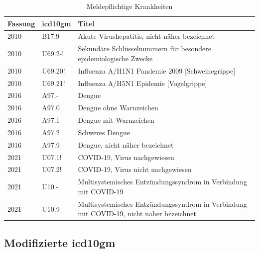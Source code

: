 \begin{table}[ht]
	\centering
	\small
	\caption[Meldepflichtige \acs{icd10gm}]{Meldepflichtige Krankheiten}
	\label{tab:meldung}
	\begin{tabular}{|l|l|p{10.5cm}|}
		\hline
		\rowcolor{lightgray} Fassung & \acs{icd10gm} & Titel \\ \hline
		2010 & B17.9 & Akute Virushepatitis, nicht näher bezeichnet \\ \hline
		2010 & U69.2-! & Sekundäre Schlüsselnummern für besondere epidemiologische Zwecke \\ \hline
		2010 & U69.20! & Influenza A/H1N1 Pandemie 2009 [Schweinegrippe] \\ \hline
		2010 & U69.21! & Influenza A/H5N1 Epidemie [Vogelgrippe] \\ \hline
		2016 & A97.- & Dengue \\ \hline
		2016 & A97.0 & Dengue ohne Warnzeichen \\ \hline
		2016 & A97.1 & Dengue mit Warnzeichen \\ \hline
		2016 & A97.2 & Schweres Dengue \\ \hline
		2016 & A97.9 & Dengue, nicht näher bezeichnet \\ \hline
		2021 & U07.1! & COVID-19, Virus nachgewiesen \\ \hline
		2021 & U07.2! & COVID-19, Virus nicht nachgewiesen \\ \hline
		2021 & U10.- & Multisystemisches Entzündungssyndrom in Verbindung mit COVID-19 \\ \hline
		2021 & U10.9 & Multisystemisches Entzündungssyndrom in Verbindung mit COVID-19, nicht näher bezeichnet \\ \hline
	\end{tabular}
\end{table}

\newpage

\subsection{Modifizierte \acs{icd10gm}}

